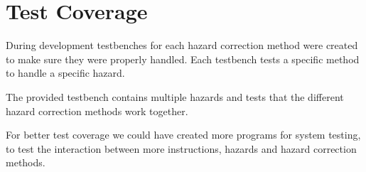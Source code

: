 \section{Test Coverage}
During development testbenches for each hazard correction method were created to make sure they were properly handled.
Each testbench tests a specific method to handle a specific hazard.

The provided testbench contains multiple hazards and tests that the different hazard correction methods work together.

For better test coverage we could have created more programs for system testing,
to test the interaction between more instructions, hazards and hazard correction methods.


